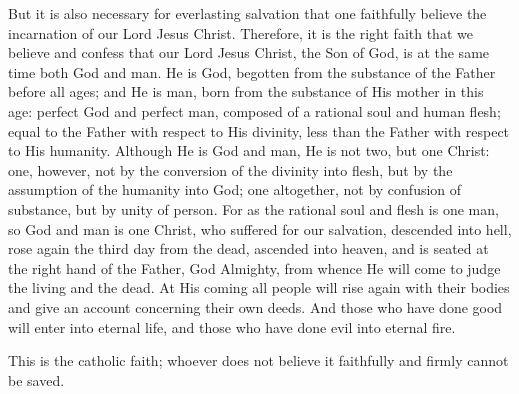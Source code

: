 But it is also necessary for everlasting salvation that one faithfully believe the incarnation of 
our Lord Jesus Christ. Therefore, it is the right faith that we believe and confess that our 
Lord Jesus Christ, the Son of God, is at the same time both God and man. He is God, 
begotten from the substance of the Father before all ages; and He is man, born from the 
substance of His mother in this age: perfect God and perfect man, composed of a rational 
soul and human flesh; equal to the Father with respect to His divinity, less than the Father 
with respect to His humanity. Although He is God and man, He is not two, but one Christ: 
one, however, not by the conversion of the divinity into flesh, but by the assumption of the 
humanity into God; one altogether, not by confusion of substance, but by unity of person. 
For as the rational soul and flesh is one man, so God and man is one Christ, who suffered for 
our salvation, descended into hell, rose again the third day from the dead, ascended into 
heaven, and is seated at the right hand of the Father, God Almighty, from whence He will 
come to judge the living and the dead. At His coming all people will rise again with their 
bodies and give an account concerning their own deeds. And those who have done good will 
enter into eternal life, and those who have done evil into eternal fire. 
 
This is the catholic faith; whoever does not believe it faithfully and firmly cannot be saved.
